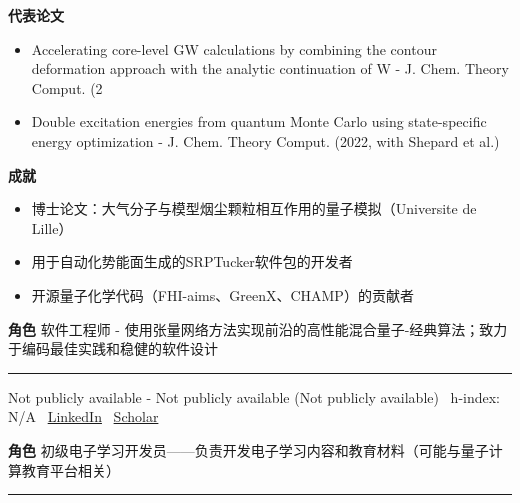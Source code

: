 \par{\footnotesize\color{mainred}\textbf{代表论文}}
\begin{itemize}[leftmargin=1.2em,itemsep=0pt,topsep=0pt]
\item {\footnotesize Accelerating core-level GW calculations by combining the contour deformation approach with the analytic continuation of W - J. Chem. Theory Comput. (2}
\item {\footnotesize Double excitation energies from quantum Monte Carlo using state-specific energy optimization - J. Chem. Theory Comput. (2022, with Shepard et al.)}
\end{itemize}
\par{\footnotesize\color{mainred}\textbf{成就}}
\begin{itemize}[leftmargin=1.2em,itemsep=0pt,topsep=0pt]
\item {\footnotesize 博士论文：大气分子与模型烟尘颗粒相互作用的量子模拟（Universite de Lille）}
\item {\footnotesize 用于自动化势能面生成的SRPTucker软件包的开发者}
\item {\footnotesize 开源量子化学代码（FHI-aims、GreenX、CHAMP）的贡献者}
\end{itemize}
\par{\footnotesize\color{mainred}\textbf{角色}} {\footnotesize 软件工程师 - 使用张量网络方法实现前沿的高性能混合量子-经典算法；致力于编码最佳实践和稳健的软件设计}
\vspace{2pt}\hrule\vspace{2pt}
\vspace{4pt}
\par{\footnotesize\color{graytext}Not publicly available - Not publicly available (Not publicly available) \textbar\  h-index: N/A \textbar\  \href{https://www.linkedin.com/in/cannur-floszmann/}{LinkedIn} \textbar\  \href{Not found}{Scholar}}
\par{\footnotesize\color{mainred}\textbf{角色}} {\footnotesize 初级电子学习开发员——负责开发电子学习内容和教育材料（可能与量子计算教育平台相关）}
\vspace{2pt}\hrule\vspace{2pt}
